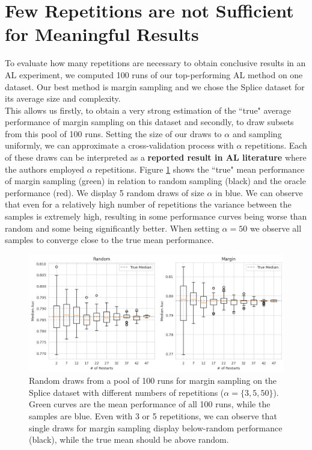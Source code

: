 \documentclass[]{article}
\begin{document}
\section{Few Repetitions are not Sufficient for Meaningful Results}\label{sec:restarts}
To evaluate how many repetitions are necessary to obtain conclusive results in an AL experiment, we computed 100 runs of our top-performing AL method on one dataset.
Our best method is margin sampling and we chose the Splice dataset for its average size and complexity. \\
This allows us firstly, to obtain a very strong estimation of the ``true" average performance of margin sampling on this dataset and secondly, to draw subsets from this pool of 100 runs.
Setting the size of our draws to $\alpha$ and sampling uniformly, we can approximate a cross-validation process with $\alpha$ repetitions.
Each of these draws can be interpreted as a \textbf{reported result in AL literature} where the authors employed $\alpha$ repetitions.
Figure \ref{fig:restarts} shows the ``true" mean performance of margin sampling (green) in relation to random sampling (black) and the oracle performance (red).
We display 5 random draws of size $\alpha$ in blue.
We can observe that even for a relatively high number of repetitions the variance between the samples is extremely high, resulting in some performance curves being worse than random and some being significantly better.
When setting $\alpha = 50$ we observe all samples to converge close to the true mean performance. 
\begin{figure}
	\centering
	\caption{Random draws from a pool of 100 runs for margin sampling on the Splice dataset with different numbers of repetitions ($\alpha=\{3,5,50\}$). Green curves are the mean performance of all 100 runs, while the samples are blue. Even with 3 or 5 repetitions, we can observe that single draws for margin sampling display below-random performance (black), while the true mean should be above random.}
	\label{fig:restarts}
	\includegraphics[width=\linewidth]{img/ablation_restarts}
\end{figure}
\end{document}
